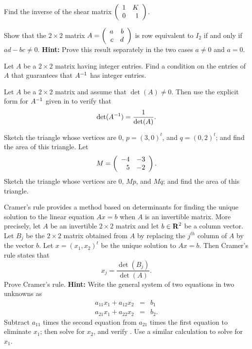\begin{exercise} \label{c7.8.4}
Find the inverse of the shear matrix $\left(\begin{array}{rr} 1 & K\\ 0 &1\end{array}\right)$.
\end{exercise}

\begin{exercise} \label{c4.9.4}
Show that the $2\times 2$ matrix $A=\left(\begin{array}{rr} a & b\\ c &d\end{array}\right)$ is row
equivalent to $I_2$ if and only if $ad-bc\neq 0$.  {\bf Hint:}
Prove this result separately in the two cases $a\neq 0$ and
$a=0$.
\end{exercise}

\begin{exercise} \label{c4.9.5}
Let $A$ be a $2\times 2$ matrix having integer entries.  Find a
condition on the entries of $A$ that guarantees that $A^{-1}$ has
integer entries.
\end{exercise}

\begin{exercise} \label{c6.4.4}
Let $A$ be a $2\times 2$ matrix and assume that $\det(A)\neq 0$.
Then use the explicit form for $A^{-1}$ given in 
to verify that
\[
\det(A^{-1}) = \frac{1}{\det(A)}.
\]
\end{exercise}

\begin{exercise} \label{c7.8.3}
Sketch the triangle whose vertices are $0$, $p=(3,0)^t$, and
$q=(0,2)^t$; and find the area of this triangle.  Let
\[
M=\left(\begin{array}{rr} -4 & -3\\ 5 &-2\end{array}\right).
\]
Sketch the triangle whose vertices are $0$, $Mp$, and $Mq$; and
find the area of this triangle.
\end{exercise}

\begin{exercise} \label{c7.8.4A}
Cramer's rule  provides a method based on determinants 
for finding the unique solution to the linear equation $Ax=b$ when $A$ is 
an invertible matrix.  More precisely, let $A$ be an invertible $2\times 2$ 
matrix and let $b\in\mbox{$\bf{R}$}^2$ be a column vector. Let $B_j$ be the $2\times 2$ 
matrix obtained from $A$ by replacing the $j^{th}$ column of $A$ by the vector 
$b$.  Let $x=(x_1,x_2)^t$ be the unique solution to $Ax=b$. Then Cramer's rule
states that 
\begin{equation}  \label{E:cramer}
x_j = \frac{\det(B_j)}{\det(A)}.
\end{equation}
Prove Cramer's rule.  {\bf Hint:}  Write the general system of two equations in 
two unknowns as
\begin{eqnarray*}
a_{11}x_1+a_{12}x_2 & = & b_1\\
a_{21}x_1+a_{22}x_2 & = & b_2.
\end{eqnarray*}
Subtract $a_{11}$ times the second equation from $a_{21}$ times the first 
equation to eliminate $x_1$; then solve for $x_2$, and verify .  
Use a similar calculation to solve for $x_1$. 
\end{exercise}

